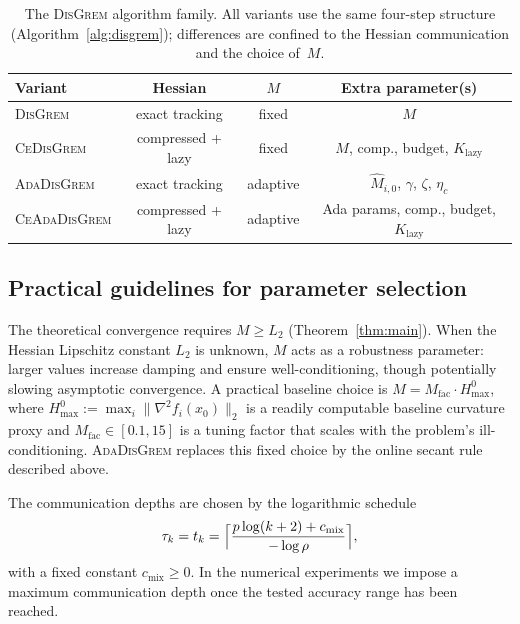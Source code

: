 \documentclass[review,onefignum,onetabnum]{siamart171218}
\begin{document}
	\begin{table}[htbp]
		\centering
		\caption{The \textsc{DisGrem} algorithm family.
			All variants use the same four-step structure (Algorithm~\ref{alg:disgrem});
			differences are confined to the Hessian communication and the choice of~$M$.}
		\label{tab:family}
		\setlength{\tabcolsep}{3pt}
		\footnotesize
		\begin{tabular}{lccc}
			\toprule
			Variant & Hessian & $M$ & Extra parameter(s) \\
			\midrule
			\textsc{DisGrem}       & exact tracking       & fixed  & $M$ \\
			\textsc{CeDisGrem}     & compressed + lazy     & fixed  & $M$, comp., budget, $K_{\mathrm{lazy}}$ \\
		\textsc{AdaDisGrem}    & exact tracking       & adaptive & $\hat M_{i,0}$, $\gamma$, $\zeta$, $\eta_c$ \\
		\textsc{CeAdaDisGrem}  & compressed + lazy     & adaptive & Ada params, comp., budget, $K_{\mathrm{lazy}}$ \\
			\bottomrule
		\end{tabular}
	\end{table}
	
	\subsection{Practical guidelines for parameter selection}\label{ssec:practical}
	
	The theoretical convergence requires $M\ge L_2$
	(Theorem~\ref{thm:main}).
	When the Hessian Lipschitz constant $L_2$ is unknown, $M$ acts as a
	robustness parameter: larger values increase damping and ensure
	well-conditioning, though potentially slowing asymptotic convergence.
	A practical baseline choice is
	$M = M_{\mathrm{fac}} \cdot H_{\max}^{0}$, where
	$H_{\max}^{0} := \max_i\|\nabla^2 f_i(x_0)\|_2$ is a readily
	computable baseline curvature proxy and
	$M_{\mathrm{fac}} \in [0.1, 15]$ is a tuning factor that scales
	with the problem's ill-conditioning.
	\textsc{AdaDisGrem} replaces this fixed choice by the online secant
	rule described above.
	
	The communication depths are chosen by the logarithmic schedule
	\[
	\tau_k=t_k=
	\Bigl\lceil \frac{p\log(k+2)+c_{\mathrm{mix}}}{-\log\rho}\Bigr\rceil,
	\]
	with a fixed constant $c_{\mathrm{mix}}\ge0$.
	In the numerical experiments we impose a maximum communication depth
	once the tested accuracy range has been reached.
	
\end{document}
